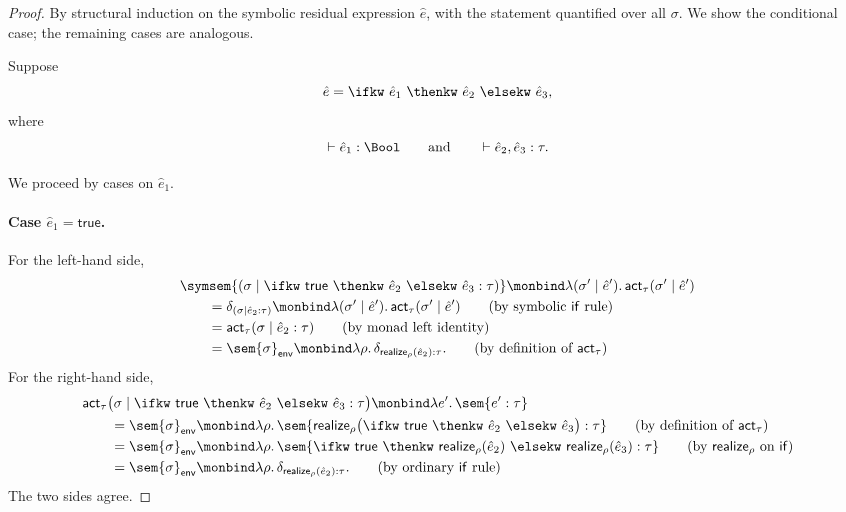 \begin{proof}
  By structural induction on the symbolic residual expression $\hat e$,
  with the statement quantified over all $\sigma$. We show the conditional
  case; the remaining cases are analogous.

  Suppose
  \[
    \hat e
    =
    \ifkw\ \hat e_1\ \thenkw\ \hat e_2\ \elsekw\ \hat e_3,
  \]
  where
  \[
    \vdash \hat e_1 : \Bool
    \qquad\text{and}\qquad
    \vdash \hat e_2,\hat e_3 : \tau.
  \]

  We proceed by cases on $\hat e_1$.

  \paragraph{Case $\hat e_1 = \mathsf{true}$.}
  For the left-hand side,
  \begin{align}
    &\symsem{
      (\sigma \mid
      \ifkw\ \mathsf{true}\ \thenkw\ \hat e_2\
      \elsekw\ \hat e_3 : \tau)
    }
    \monbind
    \lambda(\sigma' \mid \hat e').\,
    \mathsf{act}_\tau(\sigma' \mid \hat e')
    \notag \\
    &\qquad=
    \delta_{(\sigma \mid \hat e_2 : \tau)}
    \monbind
    \lambda(\sigma' \mid \hat e').\,
    \mathsf{act}_\tau(\sigma' \mid \hat e')
    \tag{\text{by symbolic $\mathsf{if}$ rule}} \\
    &\qquad=
    \mathsf{act}_\tau(\sigma \mid \hat e_2 : \tau)
    \tag{\text{by monad left identity}} \\
    &\qquad=
    \sem{\sigma}_{\mathsf{env}}
    \monbind
    \lambda\rho.\,
    \delta_{\mathsf{realize}_\rho(\hat e_2) : \tau}.
    \tag{\text{by definition of $\mathsf{act}_\tau$}}
  \end{align}
  For the right-hand side,
  \begin{align}
    &\mathsf{act}_\tau
    \bigl(
      \sigma
      \mid
      \ifkw\ \mathsf{true}\ \thenkw\ \hat e_2\
      \elsekw\ \hat e_3 : \tau
    \bigr)
    \monbind
    \lambda e'.\,\sem{e' : \tau}
    \notag \\
    &\qquad=
    \sem{\sigma}_{\mathsf{env}}
    \monbind
    \lambda\rho.\,
    \sem{
      \mathsf{realize}_\rho
      \bigl(
        \ifkw\ \mathsf{true}\ \thenkw\ \hat e_2\
        \elsekw\ \hat e_3
      \bigr)
      : \tau
    }
    \tag{\text{by definition of $\mathsf{act}_\tau$}} \\
    &\qquad=
    \sem{\sigma}_{\mathsf{env}}
    \monbind
    \lambda\rho.\,
    \sem{
      \ifkw\ \mathsf{true}\
      \thenkw\ \mathsf{realize}_\rho(\hat e_2)\
      \elsekw\ \mathsf{realize}_\rho(\hat e_3)
      : \tau
    }
    \tag{\text{by $\mathsf{realize}_\rho$ on $\mathsf{if}$}} \\
    &\qquad=
    \sem{\sigma}_{\mathsf{env}}
    \monbind
    \lambda\rho.\,
    \delta_{\mathsf{realize}_\rho(\hat e_2) : \tau}.
    \tag{\text{by ordinary $\mathsf{if}$ rule}}
  \end{align}
  The two sides agree.


\end{proof}
